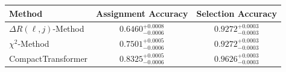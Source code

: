     \begin{tabular}{lcc}
        \toprule
        Method & Assignment Accuracy & Selection Accuracy \\
        \midrule
        $\Delta R(\ell,j)$-Method & $0.6460^{+0.0008}_{-0.0006}$ & $0.9272^{+0.0003}_{-0.0003}$ \\
        $\chi^2$-Method & $0.7501^{+0.0005}_{-0.0006}$ & $0.9272^{+0.0003}_{-0.0003}$ \\
        CompactTransformer & $0.8325^{+0.0005}_{-0.0006}$ & $0.9626^{+0.0003}_{-0.0003}$ \\
        \bottomrule
    \end{tabular}